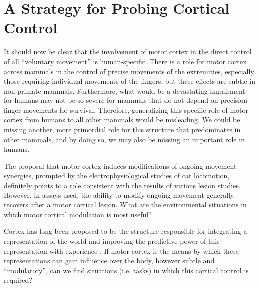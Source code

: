 \section{A Strategy for Probing Cortical Control}

It should now be clear that the involvement of motor cortex in the direct control of all ``voluntary movement'' is human-specific. There is a role for motor cortex across mammals in the control of precise movements of the extremities, especially those requiring individual movements of the fingers, but these effects are subtle in non-primate mammals. Furthermore, what would be a devastating impairment for humans may not be so severe for mammals that do not depend on precision finger movements for survival. Therefore, generalizing this specific role of motor cortex from humans to all other mammals would be misleading. We could be missing another, more primordial role for this structure that predominates in other mammals, and by doing so, we may also be missing an important role in humans.

The proposal that motor cortex induces modifications of ongoing movement synergies, prompted by the electrophysiological studies of cat locomotion, definitely points to a role consistent with the results of various lesion studies. However, in assays used, the ability to modify ongoing movement generally recovers after a motor cortical lesion. What are the environmental situations in which motor cortical modulation is most useful?

Cortex has long been proposed to be the structure responsible for integrating a representation of the world and improving the predictive power of this representation with experience \cite{Barlow1985,Doya1999}. If motor cortex is the means by which these representations can gain influence over the body, however subtle and ``modulatory'', can we find situations (i.e. tasks) in which this cortical control is required?

